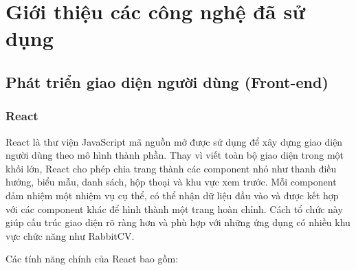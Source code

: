 \chapter{Giới thiệu các công nghệ đã sử dụng}
\label{chap:used-technologies}


\section{Phát triển giao diện người dùng (Front-end)}

\subsection{React}

React là thư viện JavaScript mã nguồn mở được sử dụng để xây dựng giao diện người dùng theo mô hình thành phần. Thay vì viết toàn bộ giao diện trong một khối lớn, React cho phép chia trang thành các component nhỏ như thanh điều hướng, biểu mẫu, danh sách, hộp thoại và khu vực xem trước. Mỗi component đảm nhiệm một nhiệm vụ cụ thể, có thể nhận dữ liệu đầu vào và được kết hợp với các component khác để hình thành một trang hoàn chỉnh. Cách tổ chức này giúp cấu trúc giao diện rõ ràng hơn và phù hợp với những ứng dụng có nhiều khu vực chức năng như RabbitCV.

Các tính năng chính của React bao gồm:

